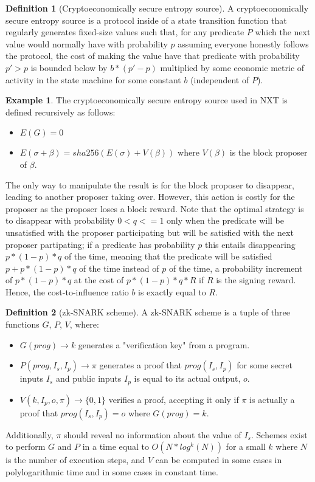 \documentclass[11pt,a4paper]{report}
\theoremstyle{plain}
\theoremstyle{definition}
\newtheorem{defn}{Definition}[chapter]
\newtheorem{exmp}{Example}[section]
\theoremstyle{remark}
\begin{document}
\begin{defn}[Cryptoeconomically secure entropy source]
A cryptoeconomically secure entropy source is a protocol inside of a state transition function that regularly generates fixed-size values such that, for any predicate $P$ which the next value would normally have with probability $p$ assuming everyone honestly follows the protocol, the cost of making the value have that predicate with probability $p' > p$ is bounded below by $b * (p' - p)$ multiplied by some economic metric of activity in the state machine for some constant $b$ (independent of $P$).
\end{defn}

\begin{exmp}
The cryptoeconomically secure entropy source used in NXT\cite{nxtinside} is defined recursively as follows:
\begin{itemize}
\item
$E(G) = 0$
\item
$E(\sigma + \beta) = sha256(E(\sigma) + V(\beta))$ where $V(\beta)$ is the block proposer of $\beta$.
\end{itemize}
The only way to manipulate the result is for the block proposer to disappear, leading to another proposer taking over. However, this action is costly for the proposer as the proposer loses a block reward. Note that the optimal strategy is to disappear with probability $0 < q <= 1$ only when the predicate will be unsatisfied with the proposer participating but will be satisfied with the next proposer partipating; if a predicate has probability $p$ this entails disappearing $p * (1-p) * q$ of the time, meaning that the predicate will be satisfied $p + p * (1-p) * q$ of the time instead of $p$ of the time, a probability increment of $p * (1-p) * q$ at the cost of $p * (1-p) * q * R$ if $R$ is the signing reward. Hence, the cost-to-influence ratio $b$ is exactly equal to $R$.
\end{exmp}

\begin{defn}[zk-SNARK scheme]
A zk-SNARK scheme is a tuple of three functions $G$, $P$, $V$, where:
\begin{itemize}
\item
$G(prog) \rightarrow k$ generates a "verification key" from a program.
\item
$P(prog, I_s, I_p) \rightarrow \pi$ generates a proof that $prog(I_s, I_p)$ for some secret inputs $I_s$ and public inputs $I_p$ is equal to its actual output, $o$.
\item
$V(k, I_p, o, \pi) \rightarrow \{0, 1\}$ verifies a proof, accepting it only if $\pi$ is actually a proof that $prog(I_s, I_p) = o$ where $G(prog) = k$.
\end{itemize}
Additionally, $\pi$ should reveal no information about the value of $I_s$. Schemes exist \cite{snark} to perform $G$ and $P$ in a time equal to $O(N*log^k(N))$ for a small $k$ where $N$ is the number of execution steps, and $V$ can be computed in some cases in polylogarithmic time and in some cases in constant time.
\end{defn}
\end{document}
